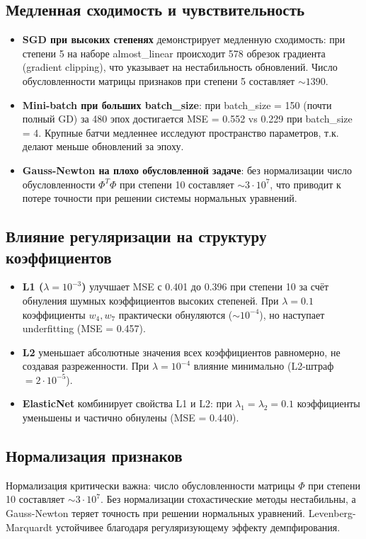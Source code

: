\documentclass[12pt]{article}
\begin{document}
\subsection*{Медленная сходимость и чувствительность}

\begin{itemize}
    \item \textbf{SGD при высоких степенях} демонстрирует медленную сходимость: при степени 5 на наборе almost\_linear происходит 578 обрезок градиента (gradient clipping), что указывает на нестабильность обновлений. Число обусловленности матрицы признаков при степени 5 составляет $\sim 1390$.

    \item \textbf{Mini-batch при больших batch\_size}: при batch\_size = 150 (почти полный GD) за 480 эпох достигается MSE = 0.552 vs 0.229 при batch\_size = 4. Крупные батчи медленнее исследуют пространство параметров, т.к. делают меньше обновлений за эпоху.

    \item \textbf{Gauss-Newton на плохо обусловленной задаче}: без нормализации число обусловленности $\Phi^T\Phi$ при степени 10 составляет $\sim 3 \cdot 10^7$, что приводит к потере точности при решении системы нормальных уравнений.
\end{itemize}

\subsection*{Влияние регуляризации на структуру коэффициентов}

\begin{itemize}
    \item \textbf{L1 ($\lambda=10^{-3}$)} улучшает MSE с 0.401 до 0.396 при степени 10 за счёт обнуления шумных коэффициентов высоких степеней. При $\lambda=0.1$ коэффициенты $w_4, w_7$ практически обнуляются ($\sim 10^{-4}$), но наступает underfitting (MSE = 0.457).

    \item \textbf{L2} уменьшает абсолютные значения всех коэффициентов равномерно, не создавая разреженности. При $\lambda=10^{-4}$ влияние минимально (L2-штраф $= 2 \cdot 10^{-5}$).

    \item \textbf{ElasticNet} комбинирует свойства L1 и L2: при $\lambda_1 = \lambda_2 = 0.1$ коэффициенты уменьшены и частично обнулены (MSE = 0.440).
\end{itemize}

\subsection*{Нормализация признаков}

Нормализация критически важна: число обусловленности матрицы $\Phi$ при степени 10 составляет $\sim 3 \cdot 10^7$. Без нормализации стохастические методы нестабильны, а Gauss-Newton теряет точность при решении нормальных уравнений. Levenberg-Marquardt устойчивее благодаря регуляризующему эффекту демпфирования.
\end{document}
